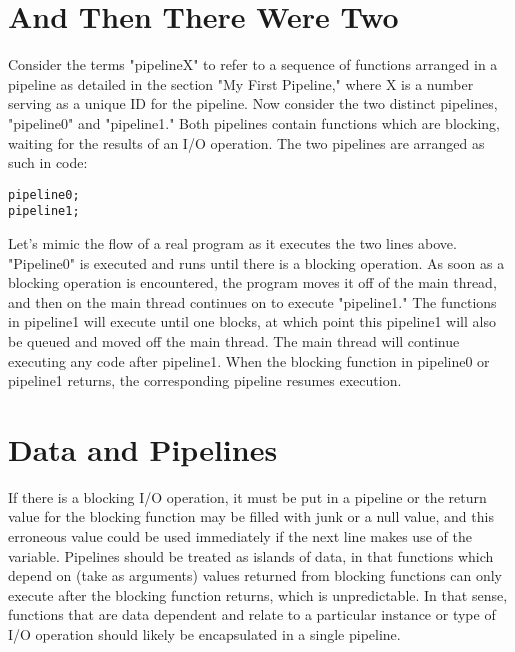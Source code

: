 \documentclass[./LRM_main.tex]{subfiles}
\begin{document}
\section{And Then There Were Two}
Consider the terms "pipelineX" to refer to a sequence of functions arranged in a pipeline as detailed in the section "My First Pipeline," where X is a number serving as a unique ID for the pipeline. Now consider the two distinct pipelines, "pipeline0" and "pipeline1." Both pipelines contain functions which are blocking, waiting for the results of an I/O operation. The two pipelines are arranged as such in code:
\begin{lstlisting}
pipeline0;
pipeline1;
\end{lstlisting}
Let's mimic the flow of a real program as it executes the two lines above. "Pipeline0" is executed and runs until there is a blocking operation. As soon as a blocking operation is encountered, the program moves it off of the main thread, and then on the main thread continues on to execute "pipeline1." The functions in pipeline1 will execute until one blocks, at which point this pipeline1 will also be queued and moved off the main thread. The main thread will continue executing any code after pipeline1. When the blocking function in pipeline0 or pipeline1 returns, the corresponding pipeline resumes execution.   


\section{Data and Pipelines}
If there is a blocking I/O operation, it must be put in a pipeline or the return value for the blocking function may be filled with junk or a null value, and this erroneous value could be used immediately if the next line makes use of the variable. Pipelines should be treated as islands of data, in that functions which depend on (take as arguments) values returned from blocking functions can only execute after the blocking function returns, which is unpredictable. In that sense, functions that are data dependent and relate to a particular instance or type of I/O operation should likely be encapsulated in a single pipeline. 
\end{document}
